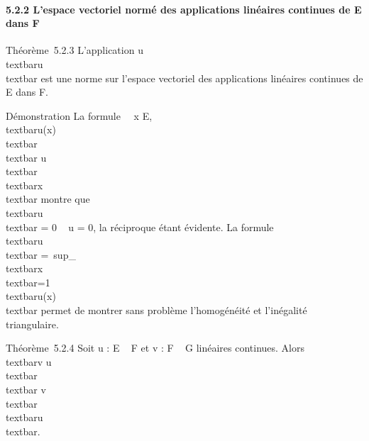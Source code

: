 \documentclass[]{article}
\begin{document}
\paragraph{5.2.2 L'espace vectoriel normé des applications linéaires
continues de E dans F}

Théorème~5.2.3 L'application
u\mapsto~\\textbar{}u\\textbar{}
est une norme sur l'espace vectoriel des applications linéaires
continues de E dans F.

Démonstration La formule \forall~~x \in E,
\\textbar{}u(x)\\textbar{}
\leq\\textbar{}
u\\textbar{}\,\\textbar{}x\\textbar{}
montre que \\textbar{}u\\textbar{} = 0 \rigtharrow~ u
= 0, la réciproque étant évidente. La formule
\\textbar{}u\\textbar{}
=\
sup\_\\textbar{}x\\textbar{}=1\\textbar{}u(x)\\textbar{}
permet de montrer sans problème l'homogénéité et l'inégalité
triangulaire.

Théorème~5.2.4 Soit u : E \rightarrow~ F et v : F \rightarrow~ G linéaires continues. Alors
\\textbar{}v \cdot u\\textbar{}
\leq\\textbar{}
v\\textbar{}\,\\textbar{}u\\textbar{}.
\end{document}
